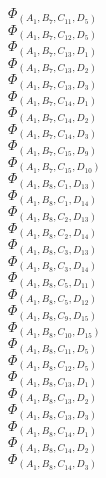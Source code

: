 \documentclass[14pt]{article}
\begin{document}
    $\Phi_{({A}_{1}, {B}_{7}, {C}_{11}, {D}_{5})}$ \\ 
    $\Phi_{({A}_{1}, {B}_{7}, {C}_{12}, {D}_{5})}$ \\ 
    $\Phi_{({A}_{1}, {B}_{7}, {C}_{13}, {D}_{1})}$ \\ 
    $\Phi_{({A}_{1}, {B}_{7}, {C}_{13}, {D}_{2})}$ \\ 
    $\Phi_{({A}_{1}, {B}_{7}, {C}_{13}, {D}_{3})}$ \\ 
    $\Phi_{({A}_{1}, {B}_{7}, {C}_{14}, {D}_{1})}$ \\ 
    $\Phi_{({A}_{1}, {B}_{7}, {C}_{14}, {D}_{2})}$ \\ 
    $\Phi_{({A}_{1}, {B}_{7}, {C}_{14}, {D}_{3})}$ \\ 
    $\Phi_{({A}_{1}, {B}_{7}, {C}_{15}, {D}_{9})}$ \\ 
    $\Phi_{({A}_{1}, {B}_{7}, {C}_{15}, {D}_{10})}$ \\ 
    $\Phi_{({A}_{1}, {B}_{8}, {C}_{1}, {D}_{13})}$ \\ 
    $\Phi_{({A}_{1}, {B}_{8}, {C}_{1}, {D}_{14})}$ \\ 
    $\Phi_{({A}_{1}, {B}_{8}, {C}_{2}, {D}_{13})}$ \\ 
    $\Phi_{({A}_{1}, {B}_{8}, {C}_{2}, {D}_{14})}$ \\ 
    $\Phi_{({A}_{1}, {B}_{8}, {C}_{3}, {D}_{13})}$ \\ 
    $\Phi_{({A}_{1}, {B}_{8}, {C}_{3}, {D}_{14})}$ \\ 
    $\Phi_{({A}_{1}, {B}_{8}, {C}_{5}, {D}_{11})}$ \\ 
    $\Phi_{({A}_{1}, {B}_{8}, {C}_{5}, {D}_{12})}$ \\ 
    $\Phi_{({A}_{1}, {B}_{8}, {C}_{9}, {D}_{15})}$ \\ 
    $\Phi_{({A}_{1}, {B}_{8}, {C}_{10}, {D}_{15})}$ \\ 
    $\Phi_{({A}_{1}, {B}_{8}, {C}_{11}, {D}_{5})}$ \\ 
    $\Phi_{({A}_{1}, {B}_{8}, {C}_{12}, {D}_{5})}$ \\ 
    $\Phi_{({A}_{1}, {B}_{8}, {C}_{13}, {D}_{1})}$ \\ 
    $\Phi_{({A}_{1}, {B}_{8}, {C}_{13}, {D}_{2})}$ \\ 
    $\Phi_{({A}_{1}, {B}_{8}, {C}_{13}, {D}_{3})}$ \\ 
    $\Phi_{({A}_{1}, {B}_{8}, {C}_{14}, {D}_{1})}$ \\ 
    $\Phi_{({A}_{1}, {B}_{8}, {C}_{14}, {D}_{2})}$ \\ 
    $\Phi_{({A}_{1}, {B}_{8}, {C}_{14}, {D}_{3})}$ \\ 
\end{document}
